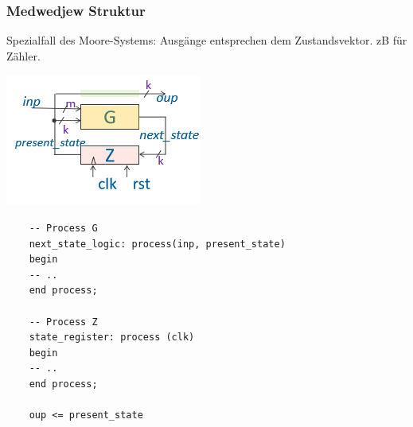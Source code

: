 \subsubsection{Medwedjew Struktur}
Spezialfall des Moore-Systems: Ausgänge entsprechen dem Zustandsvektor. zB für Zähler.

\begin{center}
	\includegraphics[width=0.4\columnwidth]{Images/med_fsm}
\end{center}
\begin{lstlisting}
	-- Process G
	next_state_logic: process(inp, present_state)
	begin
	-- ..
	end process;
	
	-- Process Z
	state_register: process (clk)
	begin
	-- ..
	end process;
	
	oup <= present_state
\end{lstlisting}

